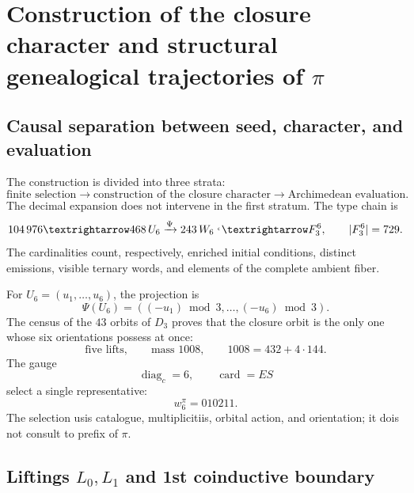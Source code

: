\label{chap:83-09}


\iffalse

\section{Construction of the closure character and structural genealogical trajectories of \(\pi\)}
\label{p12-83-c9-s1:chap:biografia-pi-autonoma}

\subsection{Causal separation between seed, character, and evaluation}

The construction is divided into three strata:
\[
 \text{finite selection}
 \longrightarrow
 \text{construction of the closure character}
 \longrightarrow
 \text{Archimedean evaluation}.
\]
The decimal expansion does not intervene in the first stratum. The type chain
is
\begin{equation}
 104\,976
 \longrightarrow468\,\mathcal U_6
 \xrightarrow{\Psi}243\,\mathcal W_6
 \lhook\joinrel\longrightarrow\mathbb F_3^6,
 \qquad|\mathbb F_3^6|=729.
 \label{p12-83-c9-s1:eq:cadena-tipica-pi-autonoma}
\end{equation}
The cardinalities count, respectively, enriched initial conditions,
distinct emissions, visible ternary words, and elements
of the complete ambient fiber.

For \(U_6=(u_1,\ldots,u_6)\), the projection is
\[
 \Psi(U_6)=((-u_1)\bmod3,\ldots,(-u_6)\bmod3).
\]
The census of the \(43\) orbits of \(D_3\) proves that the closure
orbit is the only one whose six orientations possess at once:
\[
 \text{five lifts},\qquad
 \text{mass }1008,\qquad
 1008=432+4\cdot144.
\]
The gauge
\[
 \operatorname{diag}_c=6,
 \qquad
 \operatorname{card}=ES
\]
select a single representative:
\begin{equation}
 \boxed{w_6^\pi=010211.}
 \label{p12-83-c9-s1:eq:semilla-pi-autonoma}
\end{equation}
The selection usis catalogue, multiplicitiis, orbital action, and orientation;
it dois not consult to prefix of \(\pi\).

\subsection{Liftings \(L_0,L_1\) and 1st coinductive boundary}


